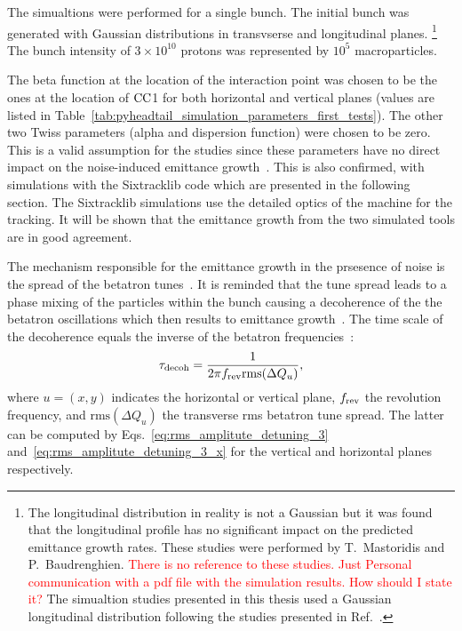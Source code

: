 The simualtions were performed for a single bunch. The initial bunch was generated with Gaussian distributions in transvserse and longitudinal planes. \footnote{The longitudinal distribution in reality is not a Gaussian but it was found that the longitudinal profile has no significant impact on the predicted emittance growth rates. These studies were performed by T.~Mastoridis and P.~Baudrenghien. \textcolor{red}{There is no reference to these studies. Just Personal communication with a pdf file with the simulation results. How should I state it?} The simualtion studies presented in this thesis used a Gaussian longitudinal distribution following the studies presented in Ref.~\cite{PhysRevSTAB.18.101001}.} 
The bunch intensity of $3\times 10^{10}$ protons was represented by $10^5$ macroparticles. 

The beta function at the location of the interaction point was chosen to be the ones at the location of ${\mathrm{CC}}$1 for both horizontal and vertical planes (values are listed in Table~\ref{tab:pyheadtail_simulation_parameters_first_tests}). The other two Twiss parameters (alpha and dispersion function) were chosen to be zero. This is a valid assumption for the studies since these parameters have no direct impact on the noise-induced emittance growth~\cite{PhysRevSTAB.18.101001}. %
This is also confirmed, with simulations with the Sixtracklib code which are presented in the following section. The Sixtracklib simulations use the detailed optics of the machine for the tracking. It will be shown that the emittance growth from the two simulated tools are in good agreement.

The mechanism responsible for the emittance growth in the prsesence of noise is the spread of the betatron tunes~\cite{Lebedev:248620}. It is reminded that the tune spread leads to a phase mixing of the particles within the bunch causing a decoherence of the the betatron oscillations which then results to emittance growth~\cite{Lebedev:248620}. The time scale of the decoherence equals the inverse of the betatron frequencies~\cite{Lebedev:248620}: %
\begin{equation}\label{eq:decoherence_time}
    \tau_\mathrm{decoh} = \frac{1}{2\pi {f_\mathrm{rev}} \mathrm{rms}(\Delta Q_u)},
\end{equation}
where $u=(x,y)$ indicates the horizontal or vertical plane, ${f_\mathrm{rev}}$ the revolution frequency, and $\mathrm{rms}(\Delta Q_u)$ the transverse rms betatron tune spread. The latter can be computed by Eqs.~\eqref{eq:rms_amplitute_detuning_3} and~\eqref{eq:rms_amplitute_detuning_3_x} for the vertical and horizontal planes respectively.

